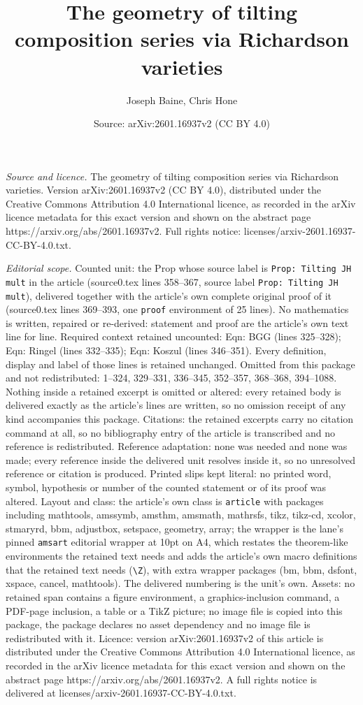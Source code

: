 \documentclass[10pt,a4paper]{amsart}
\title[The geometry of tilting composition series via Richardson va]{The geometry of tilting composition series via Richardson varieties}
\author{Joseph Baine, Chris Hone}
\date{Source: arXiv:2601.16937v2 (CC BY 4.0)}
\begin{document}
\maketitle

\noindent\emph{Source and licence.} The geometry of tilting composition series via Richardson varieties. Version arXiv:2601.16937v2 (CC BY 4.0), distributed under the Creative Commons Attribution 4.0 International licence, as recorded in the arXiv licence metadata for this exact version and shown on the abstract page https://arxiv.org/abs/2601.16937v2. Full rights notice: licenses/arxiv-2601.16937-CC-BY-4.0.txt.\par\smallskip

\noindent\textit{Editorial scope.} Counted unit: the Prop whose source label is \texttt{Prop: Tilting JH mult} in the article (source0.tex lines 358--367, source label \texttt{Prop: Tilting JH mult}), delivered together with the article's own complete original proof of it (source0.tex lines 369--393, one \texttt{proof} environment of 25 lines). No mathematics is written, repaired or re-derived: statement and proof are the article's own text line for line. Required context retained uncounted: Eqn: BGG (lines 325--328); Eqn: Ringel (lines 332--335); Eqn: Koszul (lines 346--351). Every definition, display and label of those lines is retained unchanged. Omitted from this package and not redistributed: 1--324, 329--331, 336--345, 352--357, 368--368, 394--1088. Nothing inside a retained excerpt is omitted or altered: every retained body is delivered exactly as the article's lines are written, so no omission receipt of any kind accompanies this package. Citations: the retained excerpts carry no citation command at all, so no bibliography entry of the article is transcribed and no reference is redistributed. Reference adaptation: none was needed and none was made; every reference inside the delivered unit resolves inside it, so no unresolved reference or citation is produced. Printed slips kept literal: no printed word, symbol, hypothesis or number of the counted statement or of its proof was altered. Layout and class: the article's own class is \texttt{article} with packages including mathtools, amssymb, amsthm, amsmath, mathrsfs, tikz, tikz-cd, xcolor, stmaryrd, bbm, adjustbox, setspace, geometry, array; the wrapper is the lane's pinned \texttt{amsart} editorial wrapper at 10pt on A4, which restates the theorem-like environments the retained text needs and adds the article's own macro definitions that the retained text needs (\texttt{\textbackslash Z}), with extra wrapper packages (bm, bbm, dsfont, xspace, cancel, mathtools). The delivered numbering is the unit's own. Assets: no retained span contains a figure environment, a graphics-inclusion command, a PDF-page inclusion, a table or a TikZ picture; no image file is copied into this package, the package declares no asset dependency and no image file is redistributed with it. Licence: version arXiv:2601.16937v2 of this article is distributed under the Creative Commons Attribution 4.0 International licence, as recorded in the arXiv licence metadata for this exact version and shown on the abstract page https://arxiv.org/abs/2601.16937v2. A full rights notice is delivered at licenses/arxiv-2601.16937-CC-BY-4.0.txt. 
\end{document}
